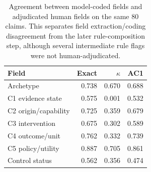 \begin{table}[t]
\centering
\small
\setlength{\tabcolsep}{4pt}
\begin{tabularx}{\columnwidth}{Xrrr}
\toprule
\textbf{Field} & \textbf{Exact} & \textbf{$\kappa$} &
\textbf{AC1} \\
\midrule
Archetype & 0.738 & 0.670 & 0.688 \\
C1 evidence state & 0.575 & 0.001 & 0.532 \\
C2 origin/capability & 0.725 & 0.359 & 0.679 \\
C3 intervention & 0.675 & 0.302 & 0.589 \\
C4 outcome/unit & 0.762 & 0.332 & 0.739 \\
C5 policy/utility & 0.887 & 0.705 & 0.861 \\
Control status & 0.562 & 0.356 & 0.474 \\
\bottomrule
\end{tabularx}
\caption{Agreement between model-coded fields and adjudicated human fields on
the same 80 claims. This separates field extraction/coding disagreement from
the later rule-composition step, although several intermediate rule flags were
not human-adjudicated.}
\label{tab:model-human-field-alignment}
\end{table}
